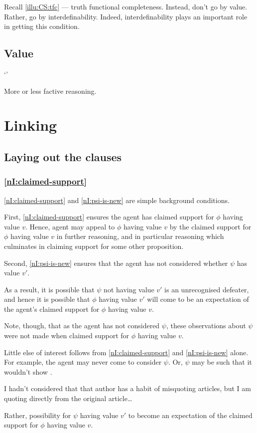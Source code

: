 \begin{note}
  \color{red}
  Recall \autoref{illu:CS:tfc} --- truth functional completeness.
  Instead, don't go by value.
  Rather, go by interdefinability.
  Indeed, interdefinability plays an important role in getting this condition.
\end{note}

\subsection{Value}

\begin{note}
  `\RBV{-}'

  More or less factive reasoning.
\end{note}

\section{Linking}
\label{sec:nI:arg:linking}

\subsection{Laying out the clauses}

\subsubsection{\ref{nI:claimed-support}}

\begin{note}
\ref{nI:claimed-support} and \ref{nI:psi-is-new} are simple background conditions.

First, \ref{nI:claimed-support} ensures the agent has claimed support for \(\phi\) having value \(v\).
Hence, agent may appeal to \(\phi\) having value \(v\) by the claimed support for \(\phi\) having value \(v\) in further reasoning, and in particular reasoning which culminates in claiming support for some other proposition.

Second, \ref{nI:psi-is-new} ensures that the agent has not considered whether \(\psi\) has value \(v'\).

As a result, it is possible that \(\psi\) not having value \(v'\) is an unrecognised defeater, and hence it is possible that \(\phi\) having value \(v'\) will come to be an expectation of the agent's claimed support for \(\phi\) having value \(v\).

Note, though, that as the agent has not considered \(\psi\), these observations about \(\psi\) were not made when claimed support for \(\phi\) having value \(v\).

Little else of interest follows from \ref{nI:claimed-support} and \ref{nI:psi-is-new} alone.
For example, the agent may never come to consider \(\psi\).
Or, \(\psi\) may be such that it wouldn't show \mom{}.

I hadn't considered that that author has a habit of misquoting articles, but I am quoting directly from the original article\dots

Rather, possibility for \(\psi\) having value \(v'\) to become an expectation of the claimed support for \(\phi\) having value \(v\).
\end{note}

